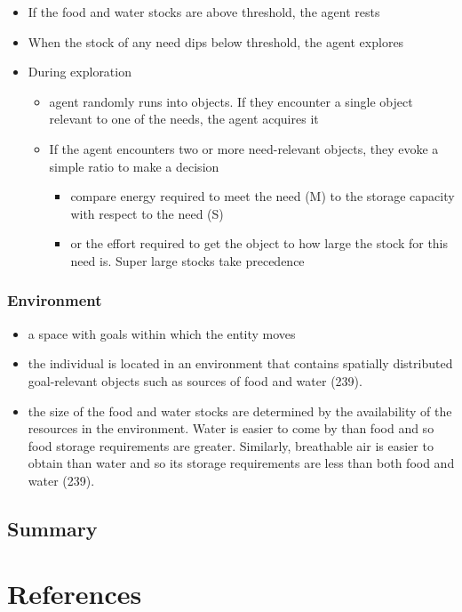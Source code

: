 \documentclass[english,,man]{apa6}
\providecommand{\tightlist}{%
  \setlength{\itemsep}{0pt}\setlength{\parskip}{0pt}}
\theoremstyle{definition}
\theoremstyle{definition}
\theoremstyle{definition}
\theoremstyle{remark}
\begin{document}
\begin{itemize}
\item
  If the food and water stocks are above threshold, the agent rests
\item
  When the stock of any need dips below threshold, the agent explores
\item
  During exploration

  \begin{itemize}
  \tightlist
  \item
    agent randomly runs into objects. If they encounter a single object
    relevant to one of the needs, the agent acquires it
  \item
    If the agent encounters two or more need-relevant objects, they
    evoke a simple ratio to make a decision

    \begin{itemize}
    \tightlist
    \item
      compare energy required to meet the need (M) to the storage
      capacity with respect to the need (S)
    \item
      or the effort required to get the object to how large the stock
      for this need is. Super large stocks take precedence
    \end{itemize}
  \end{itemize}
\end{itemize}

\hypertarget{environment}{%
\subsubsection{Environment}\label{environment}}

\begin{itemize}
\tightlist
\item
  a space with goals within which the entity moves
\item
  the individual is located in an environment that contains spatially
  distributed goal-relevant objects such as sources of food and water
  (239).
\item
  the size of the food and water stocks are determined by the
  availability of the resources in the environment. Water is easier to
  come by than food and so food storage requirements are greater.
  Similarly, breathable air is easier to obtain than water and so its
  storage requirements are less than both food and water (239).
\end{itemize}

\hypertarget{summary-2}{%
\subsection{Summary}\label{summary-2}}

\newpage

\hypertarget{references}{%
\section{References}\label{references}}

\setlength{\parindent}{-0.5in}
\setlength{\leftskip}{0.5in}
\end{document}
